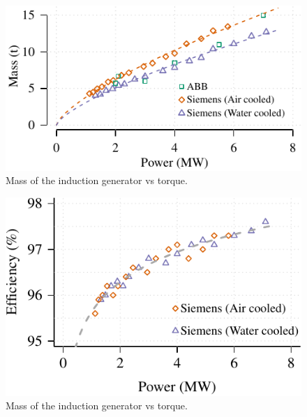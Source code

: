 \documentclass{article}\usepackage{graphicx, color}
\makeatletter
\def\maxwidth{ %
  \ifdim\Gin@nat@width>\linewidth
    \linewidth
  \else
    \Gin@nat@width
  \fi
}
\newenvironment{knitrout}{}{} %
\makeatother
\begin{document}
\begin{knitrout}
\color{fgcolor}\begin{figure}[]

\includegraphics[width=\maxwidth]{figure/induction_generator} \caption[Mass of the induction generator vs torque]{Mass of the induction generator vs torque.\label{fig:induction_generator}}
\end{figure}


\end{knitrout}


\begin{knitrout}
\color{fgcolor}\begin{figure}[]

\includegraphics[width=\maxwidth]{figure/induction_generator_eeficiency} \caption[Mass of the induction generator vs torque]{Mass of the induction generator vs torque.\label{fig:induction_generator_eeficiency}}
\end{figure}


\end{knitrout}
\end{document}
